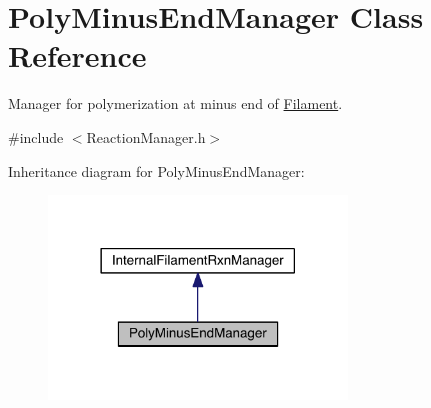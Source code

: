\hypertarget{classPolyMinusEndManager}{\section{Poly\+Minus\+End\+Manager Class Reference}
\label{classPolyMinusEndManager}
}


Manager for polymerization at minus end of \hyperlink{classFilament}{Filament}.  




{\ttfamily \#include $<$Reaction\+Manager.\+h$>$}



Inheritance diagram for Poly\+Minus\+End\+Manager\+:\nopagebreak
\begin{figure}[H]
\begin{center}
\leavevmode
\includegraphics[width=225pt]{classPolyMinusEndManager__inherit__graph}
\end{center}
\end{figure}


